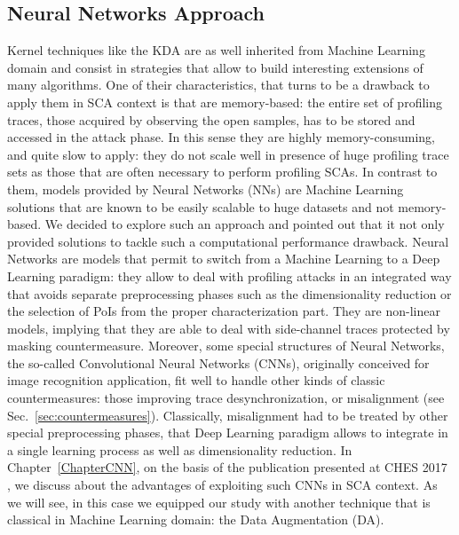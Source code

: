 \subsection{Neural Networks Approach}\label{sec:NN_intro}
Kernel techniques like the KDA  are as well inherited from Machine Learning domain and consist in strategies that allow to build interesting extensions of many algorithms. One of their characteristics, that turns to be a drawback to apply them in SCA context is that are memory-based: the entire set of profiling traces, \ie those acquired by observing the open samples, has to be stored and accessed in the attack phase. In this sense they are highly memory-consuming, and quite slow to apply: they do not scale well in presence of huge profiling trace sets as those that are often necessary to perform profiling SCAs. In contrast to them, models provided by Neural Networks (NNs) are Machine Learning solutions that are known to be easily scalable to huge datasets and not memory-based. We decided to explore such an approach and pointed out that it not only provided solutions to tackle such a computational performance drawback. Neural Networks are models that permit to switch from a Machine Learning to a Deep Learning paradigm: they allow to deal with profiling attacks in an integrated way that avoids separate preprocessing phases such as the dimensionality reduction or the selection of PoIs from the proper characterization part. They are non-linear models, implying that they are able to deal with side-channel traces protected by masking countermeasure. Moreover, some special structures of Neural Networks, the so-called Convolutional Neural Networks (CNNs), originally conceived for image recognition application, fit well to handle other kinds of classic countermeasures: those improving trace desynchronization, or misalignment (see Sec.~\ref{sec:countermeasures}). Classically, misalignment had to be treated by other special preprocessing phases, that Deep Learning paradigm allows to integrate in a single learning process as well as dimensionality reduction. In Chapter~\ref{ChapterCNN}, on the basis of the publication presented at CHES 2017 \cite{DBLP:conf/ches/CagliDP17}, we discuss about the advantages of exploiting such CNNs in SCA context. As we will see, in this case we equipped our study with another technique that is classical in Machine Learning domain: the Data Augmentation (DA). 

